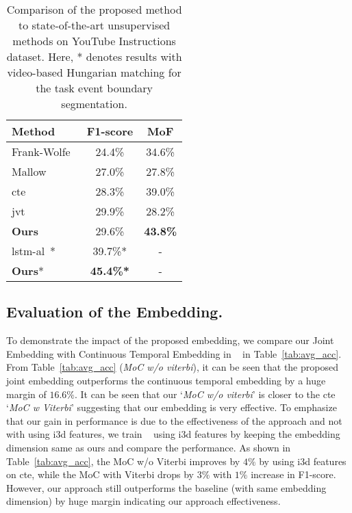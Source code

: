 \documentclass[final]{cvpr}
\begin{document}
\begin{table}[t]
  \caption{ {\small  Comparison of the proposed method to state-of-the-art unsupervised methods on YouTube Instructions dataset. Here, * denotes results with video-based Hungarian matching for the task event boundary segmentation. 
  } }
  \label{tab:acc_y}
  \centering
  \small
  \begin{tabular}{lcc}
    \toprule
    {\bf Method} & {\bf F1-score} & {\bf MoF}\\
    \midrule
    Frank-Wolfe~\cite{Alayrac16unsupervised} & 24.4\%  & 34.6\%   \\
   Mallow~\cite{sener2018unsupervised} & 27.0\%  & 27.8\%   \\
    {\sc cte}~\cite{kukleva2019unsupervised}    & 28.3\% & 39.0\%      \\
    {\sc jvt}~\cite{vidalmata2020joint} & 29.9\% & 28.2\% \\
    \midrule
    {\bf Ours} & 29.6\% &  \textbf{43.8\%}  \\
    \midrule
    \midrule
    {\sc lstm-al}~\cite{aakur2019perceptual}* & 39.7\%* & - \\
    {\bf Ours}* & \textbf{45.4\%*} & - \\
    \bottomrule
  \end{tabular}
\end{table}

\subsection{Evaluation of the Embedding.}
\label{sec:embed_eval}
To demonstrate the impact of the proposed embedding, we compare our Joint Embedding with Continuous Temporal Embedding in ~\cite{kukleva2019unsupervised} in Table~\ref{tab:avg_acc}. From Table~\ref{tab:avg_acc} (\textit{MoC w/o viterbi}), it can be seen that the proposed joint embedding outperforms the continuous temporal embedding by a huge margin of $16.6\%$. It can be seen that our `\textit{MoC w/o viterbi}' is closer to the {\sc cte} `\textit{MoC w Viterbi}' suggesting that our embedding is very effective. To emphasize that our gain in performance is due to the effectiveness of the approach and not with using {\sc i3d} features, we train ~\cite{kukleva2019unsupervised} using {\sc i3d} features by keeping the embedding dimension same as ours and compare the performance. As shown in Table~\ref{tab:avg_acc}, the MoC w/o Viterbi improves by $4\%$ by using {\sc i3d} features on {\sc cte}, while the MoC with Viterbi drops by $3\%$ with $1\%$ increase in F1-score. However, our approach still outperforms the baseline (with same embedding dimension) by huge margin indicating our approach effectiveness.
\end{document}
